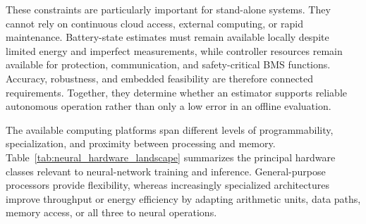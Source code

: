 \documentclass[
    a4paper,
    12pt,
    titlepage,
    bibliography=totoc,
    twoside=on,
    parskip=false,
    numbers=noenddot,
    cleardoublepage=empty,
    DIV=12,
    BCOR=12.0mm,
    headheight=36pt,
    headings=openright
]{scrreprt}
\begin{document}
These constraints are particularly important for stand-alone systems. They cannot rely on continuous cloud access, external computing, or rapid maintenance. Battery-state estimates must remain available locally despite limited energy and imperfect measurements, while controller resources remain available for protection, communication, and safety-critical BMS functions. Accuracy, robustness, and embedded feasibility are therefore connected requirements. Together, they determine whether an estimator supports reliable autonomous operation rather than only a low error in an offline evaluation.

The available computing platforms span different levels of programmability, specialization, and proximity between processing and memory. Table~\ref{tab:neural_hardware_landscape} summarizes the principal hardware classes relevant to neural-network training and inference. General-purpose processors provide flexibility, whereas increasingly specialized architectures improve throughput or energy efficiency by adapting arithmetic units, data paths, memory access, or all three to neural operations.\autocite{szeEfficientProcessingDeep2017,jouppiDatacenterPerformanceAnalysis2017}
\end{document}

